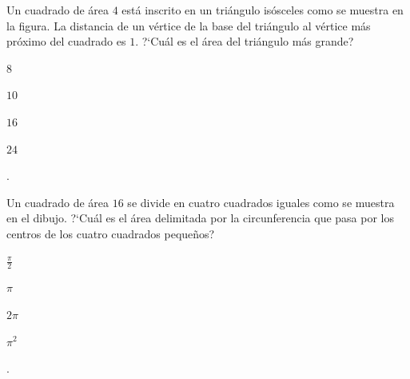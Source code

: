 \begin{Solucion}
  
\end{Solucion}

\begin{Problema}{6}
  Un cuadrado de \'area $4$ est\'a inscrito en un tri\'angulo
  is\'osceles como se muestra en la figura. La distancia de un
  v\'ertice de la base del tri\'angulo al v\'ertice m\'as pr\'oximo
  del cuadrado es $1$. ?`Cu\'al es el \'area del tri\'angulo m\'as
  grande?

  \begin{center}
  \end{center}

  \begin{inparaenum}
  \item $8$ \esp
  \item $10$ \esp
  \item $16$ \esp
  \item $24$ \esp
  \item \nota.
  \end{inparaenum}
\end{Problema}

\begin{Solucion}
  
\end{Solucion}

\begin{Problema}{7}
  Un cuadrado de \'area $16$ se divide en cuatro cuadrados iguales
  como se muestra en el dibujo. ?`Cu\'al es el \'area delimitada por
  la circunferencia que pasa por los centros de los cuatro cuadrados
  peque\~nos?

  \begin{center}
  \end{center}

  \begin{inparaenum}
  \item $\frac{\pi}{2}$ \esp
  \item $\pi$ \esp
  \item $2 \pi$ \esp
  \item $\pi^2$ \esp
  \item \nota.
  \end{inparaenum}
\end{Problema}

\begin{Solucion}
  
\end{Solucion}

